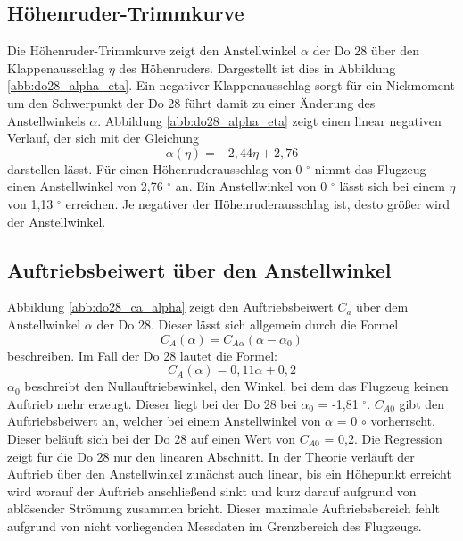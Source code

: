 \subsection{Höhenruder-Trimmkurve}
Die Höhenruder-Trimmkurve zeigt den Anstellwinkel $\alpha$ der Do 28 über den Klappenausschlag $\eta$ des Höhenruders. Dargestellt ist dies in Abbildung \ref{abb:do28_alpha_eta}. Ein negativer Klappenausschlag sorgt für ein Nickmoment um den Schwerpunkt der Do 28 führt damit zu einer Änderung des Anstellwinkels $\alpha$. Abbildung \ref{abb:do28_alpha_eta} zeigt einen linear negativen Verlauf, der sich mit der Gleichung
\begin{equation}
\alpha(\eta) = -2,44\eta + 2,76
\end{equation}
darstellen lässt. Für einen Höhenruderausschlag von 0 $^\circ$ nimmt das Flugzeug einen Anstellwinkel von 2,76 $^\circ$ an. Ein Anstellwinkel von 0 $^\circ$ lässt sich bei einem $\eta$ von 1,13 $^\circ$ erreichen. Je negativer der Höhenruderausschlag ist, desto größer wird der Anstellwinkel.
  
\subsection{Auftriebsbeiwert über den Anstellwinkel}
Abbildung \ref{abb:do28_ca_alpha} zeigt den Auftriebsbeiwert $C_a$ über dem Anstellwinkel $\alpha$ der Do 28. Dieser lässt sich allgemein durch die Formel
\begin{equation}  \label{eq:theorie_ca}
C_A(\alpha) = C_{A\alpha}(\alpha - \alpha_0)
\end{equation}
beschreiben. Im Fall der Do 28 lautet die Formel:
\begin{equation}  \label{eq:versuch_ca}
C_A(\alpha) = 0,11\alpha + 0,2
\end{equation}
$\alpha_{0}$ beschreibt den Nullauftriebswinkel, den Winkel, bei dem das Flugzeug keinen Auftrieb mehr erzeugt. Dieser liegt bei der Do 28 bei $\alpha_{0}$ = -1,81 $^\circ$. $C_{A0}$ gibt den Auftriebsbeiwert an, welcher bei einem Anstellwinkel von $\alpha$ = 0 $\circ$ vorherrscht. Dieser beläuft sich bei der Do 28 auf einen Wert von $C_{A0}$ = 0,2. Die Regression zeigt für die Do 28 nur den linearen Abschnitt. In der Theorie verläuft der Auftrieb über den Anstellwinkel zunächst auch linear, bis ein Höhepunkt erreicht wird worauf der Auftrieb anschließend sinkt und kurz darauf aufgrund von ablösender Strömung zusammen bricht.  
Dieser maximale Auftriebsbereich fehlt aufgrund von nicht vorliegenden Messdaten im Grenzbereich des Flugzeugs. 
